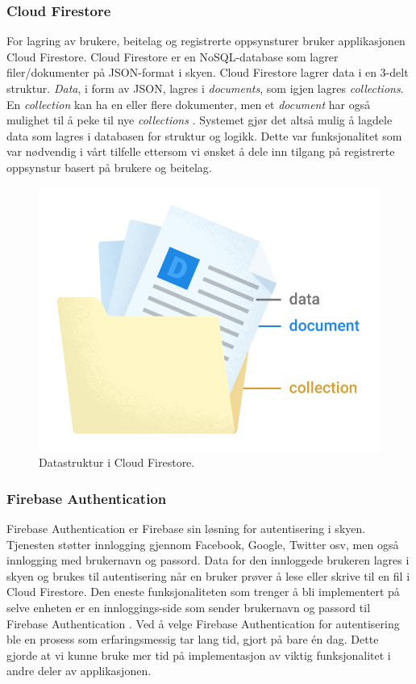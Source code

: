 \subsubsection{Cloud Firestore}
For lagring av brukere, beitelag og registrerte oppsynsturer bruker applikasjonen Cloud Firestore. Cloud Firestore er en NoSQL-database som lagrer filer/dokumenter på JSON-format i skyen. Cloud Firestore lagrer data i en 3-delt struktur. \textit{Data}, i form av JSON, lagres i \textit{documents}, som igjen lagres \textit{collections}. En \textit{collection} kan ha en eller flere dokumenter, men et \textit{document} har også mulighet til å peke til nye \textit{collections} \cite{CloudFirestoreFirebase}. Systemet gjør det altså mulig å lagdele data som lagres i databasen for struktur og logikk. Dette var funksjonalitet som var nødvendig i vårt tilfelle ettersom vi ønsket å dele inn tilgang på registrerte oppsynstur basert på brukere og beitelag.
\begin{figure}[H]
\centering
\captionsetup{width=.8\linewidth}
\includegraphics[scale=0.4]{Figurer/Bilder/structure-data-firestore.png}
\caption{Datastruktur i Cloud Firestore.}
\label{fig:firestore-datastrktur}
\end{figure}

\subsubsection{Firebase Authentication}
Firebase Authentication er Firebase sin løsning for autentisering i skyen. Tjenesten støtter innlogging gjennom Facebook, Google, Twitter osv, men også innlogging med brukernavn og passord. Data for den innloggede brukeren lagres i skyen og brukes til autentisering når en bruker prøver å lese eller skrive til en fil i Cloud Firestore. Den eneste funksjonaliteten som trenger å bli implementert på selve enheten er en innloggings-side som sender brukernavn og passord til Firebase Authentication \cite{FirebaseAuthenticationSimple}. Ved å velge Firebase Authentication for autentisering ble en prosess som erfaringsmessig tar lang tid, gjort på bare én dag. Dette gjorde at vi kunne bruke mer tid på implementasjon av viktig funksjonalitet i andre deler av applikasjonen.


